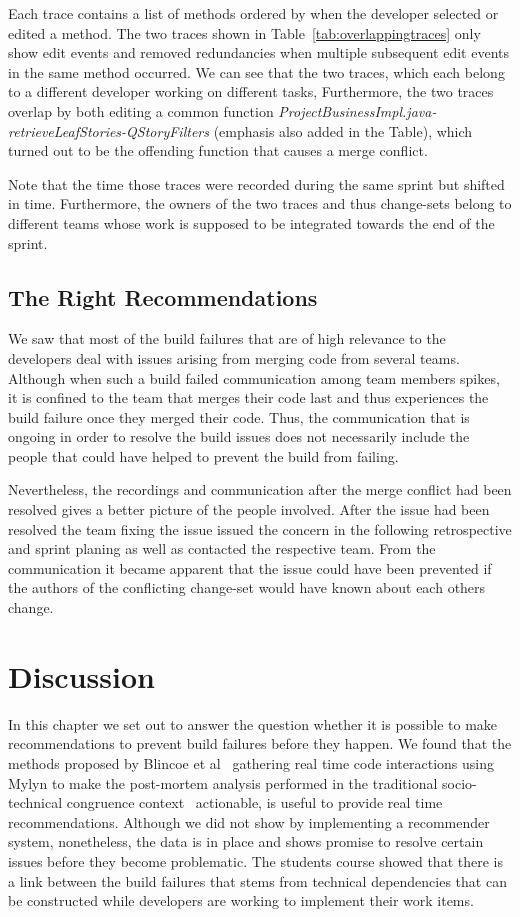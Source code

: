 Each trace contains a list of methods ordered by when the developer selected or edited a method.
The two traces shown in Table~\ref{tab:overlappingtraces} only show edit events and removed redundancies when multiple subsequent edit events in the same method occurred.
We can see that the two traces, which each belong to a different developer working on different tasks, 
Furthermore, the two traces overlap by both editing a common function \emph{ProjectBusinessImpl.java-retrieveLeafStories-QStoryFilters} (emphasis also added in the Table), which turned out to be the offending function that causes a merge conflict.

Note that the time those traces were recorded during the same sprint but shifted in time.
Furthermore, the owners of the two traces and thus change-sets belong to different teams whose work is supposed to be integrated towards the end of the sprint.

\subsection{The Right Recommendations}
We saw that most of the build failures that are of high relevance to the developers deal with issues arising from merging code from several teams.
Although when such a build failed communication among team members spikes, it is confined to the team that merges their code last and thus experiences the build failure once they merged their code.
Thus, the communication that is ongoing in order to resolve the build issues does not necessarily include the people that could have helped to prevent the build from failing.

Nevertheless, the recordings and communication after the merge conflict had been resolved gives a better picture of the people involved.
After the issue had been resolved the team fixing the issue issued the concern in the following retrospective and sprint planing as well as contacted the respective team.
From the communication it became apparent that the issue could have been prevented if the authors of the conflicting change-set would have known about each others change.

\section{Discussion}
In this chapter we set out to answer the question whether it is possible to make recommendations to prevent build failures before they happen.
We found that the methods proposed by Blincoe et al~\cite{blincoe:cscw:2012} gathering real time code interactions using Mylyn to make the post-mortem analysis performed in the traditional socio-technical congruence context~\cite{kersten:aosd:2005} actionable, is useful to provide real time recommendations.
Although we did not show by implementing a recommender system, nonetheless, the data is in place and shows promise to resolve certain issues before they become problematic.
The students course showed that there is a link between the build failures that stems from technical dependencies that can be constructed while developers are working to implement their work items.

